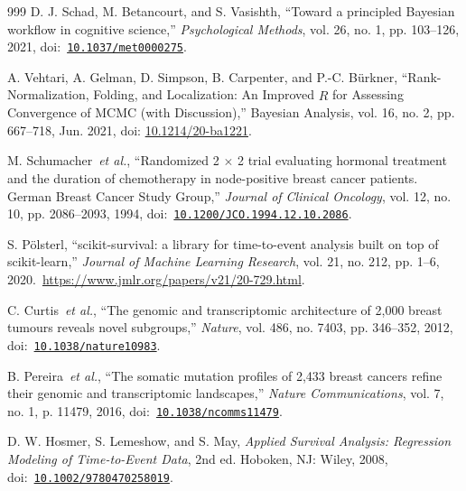\begin{thebibliography}{999}
\def\currentbiburl{https://doi.org/10.1037/met0000275}
 D. J. Schad, M. Betancourt, and S. Vasishth, ``Toward a principled Bayesian workflow in cognitive science,'' \emph{Psychological Methods}, vol. 26, no. 1, pp. 103--126, 2021, doi:~\href{https://doi.org/10.1037/met0000275}{\nolinkurl{10.1037/met0000275}}.

\def\currentbiburl{https://doi.org/10.1214/20-ba1221}
 A. Vehtari, A. Gelman, D. Simpson, B. Carpenter, and P.-C. Bürkner, ``Rank-Normalization, Folding, and Localization: An Improved $\widehat{R}$ for Assessing Convergence of MCMC (with Discussion),'' Bayesian Analysis, vol. 16, no. 2, pp. 667--718, Jun. 2021, doi: \href{https://doi.org/10.1214/20-ba1221}{10.1214/20-ba1221}.

\def\currentbiburl{https://doi.org/10.1200/JCO.1994.12.10.2086}
M. Schumacher~\emph{et al.}, ``Randomized 2 $\times$ 2 trial evaluating hormonal treatment and the duration of chemotherapy in node-positive breast cancer patients. German Breast Cancer Study Group,'' \emph{Journal of Clinical Oncology}, vol. 12, no. 10, pp. 2086--2093, 1994, doi:~\href{https://doi.org/10.1200/JCO.1994.12.10.2086}{\nolinkurl{10.1200/JCO.1994.12.10.2086}}.

\def\currentbiburl{https://www.jmlr.org/papers/v21/20-729.html}
S. P{\"o}lsterl, ``scikit-survival: a library for time-to-event analysis built on top of scikit-learn,'' \emph{Journal of Machine Learning Research}, vol. 21, no. 212, pp. 1--6, 2020.~\url{https://www.jmlr.org/papers/v21/20-729.html}.

\def\currentbiburl{https://doi.org/10.1038/nature10983}
C. Curtis~\emph{et al.}, ``The genomic and transcriptomic architecture of 2,000 breast tumours reveals novel subgroups,'' \emph{Nature}, vol. 486, no. 7403, pp. 346--352, 2012, doi:~\href{https://doi.org/10.1038/nature10983}{\nolinkurl{10.1038/nature10983}}.

\def\currentbiburl{https://doi.org/10.1038/ncomms11479}
B. Pereira~\emph{et al.}, ``The somatic mutation profiles of 2,433 breast cancers refine their genomic and transcriptomic landscapes,'' \emph{Nature Communications}, vol. 7, no. 1, p. 11479, 2016, doi:~\href{https://doi.org/10.1038/ncomms11479}{\nolinkurl{10.1038/ncomms11479}}.

\def\currentbiburl{https://doi.org/10.1002/9780470258019}
D. W. Hosmer, S. Lemeshow, and S. May, \emph{Applied Survival Analysis: Regression Modeling of Time-to-Event Data}, 2nd ed. Hoboken, NJ: Wiley, 2008, doi:~\href{https://doi.org/10.1002/9780470258019}{\nolinkurl{10.1002/9780470258019}}.


\end{thebibliography}
